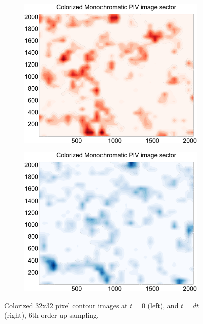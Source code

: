 \begin{figure}[H]
	\begin{subfigure}{.49\textwidth}
		\centering
		\includegraphics[width=.9\linewidth]{figs/piv_method/pive_figa_order6}
	\end{subfigure} 
	\begin{subfigure}{.49\textwidth}
		\centering
		\includegraphics[width=.9\linewidth]{figs/piv_method/pive_figb_order6}
	\end{subfigure}	
	\caption{Colorized 32x32 pixel contour images at $t=0$ (left), and $t=dt$ 
		(right), 6th order up sampling.}
	\label{fig:piv_sector_6up}
\end{figure}


